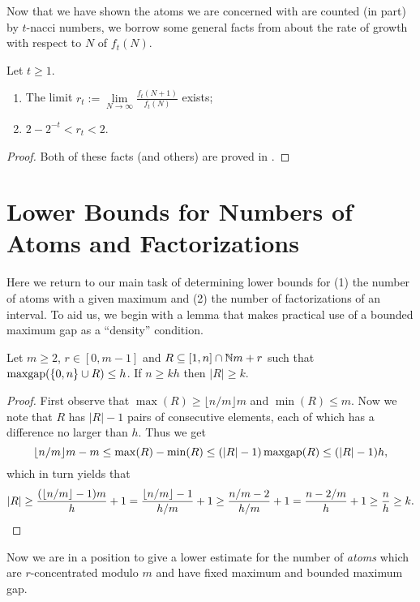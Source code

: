 Now that we have shown the atoms we are concerned with are counted (in part) by $t$-nacci numbers, we borrow some general facts from \cite{wolfram98} about the rate of growth with respect to $N$ of $f_t(N)$.

\begin{prop} \label{prop:nacci growth}
Let $t\ge 1$.
\begin{enumerate}[label = {(\roman{*})}]
	\item The limit $r_t := \lim\limits_{N\to\infty} \frac{f_t(N+1)}{f_t(N)}$ exists;
	\item $2-2^{-t} < r_t < 2$.
\end{enumerate}
\end{prop}

\begin{proof}
Both of these facts (and others) are proved in \cite[Lemma 3.6 and Corollary 3.7]{wolfram98}.
\end{proof}

\section{Lower Bounds for Numbers of Atoms and Factorizations}

Here we return to our main task of determining lower bounds for (1) the number of atoms with a given maximum and (2) the number of factorizations of an interval. 
To aid us, we begin with a lemma that makes practical use of a bounded maximum gap as a ``density'' condition.

\begin{lemma} \label{lem:bounded gap but many elements}
	Let $m\ge 2$, $r\in[0,m-1]$ and $R\subseteq [1,n]\cap\mathbb{N} m + r$ such that $\operatorname{maxgap}(\{0,n\}\cup R) \le h$.
	If $n \ge kh$ then $|R| \ge k$.
\end{lemma}

\begin{proof}
First observe that $\max(R) \ge \lfloor n/m \rfloor m$ and $\min(R) \le m$.
Now we note that $R$ has $|R|-1$ pairs of consecutive elements, each of which has a difference no larger than $h$.
Thus we get
\[ \lfloor n/m \rfloor m - m \le \max(R) - \min(R) \le (|R|-1)\operatorname{maxgap}(R) \le (|R|-1)h, \]
which in turn yields that 
\[|R| \ge \frac{(\lfloor n/m \rfloor -1)m}{h}+1 = \frac{\lfloor n/m \rfloor -1}{h/m}+1 \ge \frac{n/m-2}{h/m}+1 = \frac{n-2/m}{h}+1 \ge \frac{n}{h} \ge k.\qedhere\]
\end{proof}


Now we are in a position to give a lower estimate for the number of \textit{atoms} which are $r$-concentrated modulo $m$ and have fixed maximum and bounded maximum gap.  

